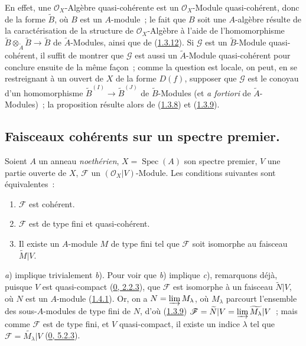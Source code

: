 En effet, une $\mathscr{O}_X$-Algèbre quasi-cohérente est un
$\mathscr{O}_X$-Module quasi-cohérent, donc de la forme $\widetilde{B}$, où
$B$ est un $A$-module~; le fait que $B$ soit une $A$-algèbre résulte de la
caractérisation de la structure de $\mathscr{O}_X$-Algèbre à l'aide de
l'homomorphisme
$\widetilde{B}\otimes_{\widetilde{A}}\widetilde{B}\to\widetilde{B}$ de
$\widetilde{A}$-Modules, ainsi que de
(\hyperref[I.1.3.12-fr]{1.3.12}). Si $\mathscr{G}$ est un
$\widetilde{B}$-Module quasi-cohérent, il suffit de montrer que $\mathscr{G}$
est aussi un $\widetilde{A}$-Module quasi-cohérent pour conclure ensuite de
la même façon~; comme la question est locale, on peut, en se restreignant à
un ouvert de $X$ de la forme $D(f)$, supposer que $\mathscr{G}$ est le
conoyau d'un homomorphisme
$\widetilde{B}^{(I)}\to\widetilde{B}^{(J)}$ de $\widetilde{B}$-Modules (et
\emph{a fortiori} de $\widetilde{A}$-Modules)~; la proposition résulte alors
de (\hyperref[I.1.3.8-fr]{1.3.8}) et
(\hyperref[I.1.3.9-fr]{1.3.9}).

\subsection{Faisceaux cohérents sur un spectre premier.}
\label{subsection:I.1.5-fr}

\begin{theorem}[1.5.1]
\label{I.1.5.1-fr}
Soient $A$ un anneau \emph{noethérien}, $X=\operatorname{Spec}(A)$ son spectre
premier, $V$ une partie ouverte de $X$, $\mathscr{F}$ un
$(\mathscr{O}_X|V)$-Module. Les conditions suivantes sont équivalentes~:
\begin{enumerate}
  \item[\textit{a})] $\mathscr{F}$ est cohérent.
  \item[\textit{b})] $\mathscr{F}$ est de type fini et quasi-cohérent.
  \item[\textit{c})] Il existe un $A$-module $M$ de type fini tel que
  $\mathscr{F}$ soit isomorphe au faisceau $\widetilde{M}|V$.
\end{enumerate}
\end{theorem}

\textit{a}) implique trivialement \textit{b}). Pour voir que \textit{b})
implique \textit{c}), remarquons déjà, puisque $V$ est quasi-compact
(\hyperref[0.2.2.3-fr]{0, 2.2.3}), que $\mathscr{F}$ est isomorphe à un
faisceau $\widetilde{N}|V$, où $N$ est un $A$-module
(\hyperref[I.1.4.1-fr]{1.4.1}). Or, on a
$N=\varinjlim M_\lambda$, où $M_\lambda$ parcourt l'ensemble des
sous-$A$-modules de type fini de $N$, d'où
(\hyperref[I.1.3.9-fr]{1.3.9})
$\mathscr{F}=\widetilde{N}|V=\varinjlim\widetilde{M_\lambda}|V$~; mais comme
$\mathscr{F}$ est de type fini, et $V$ quasi-compact, il existe un indice
$\lambda$ tel que $\mathscr{F}=\widetilde{M_\lambda}|V$
(\hyperref[0.5.2.3-fr]{0, 5.2.3}).


